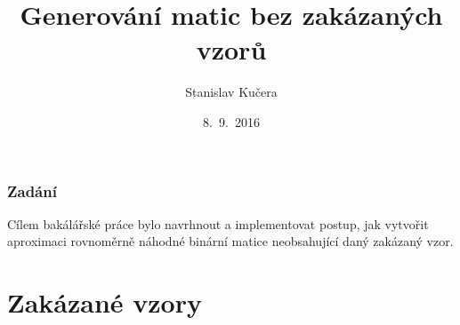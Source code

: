 \documentclass{beamer}
\title{Generování matic bez zakázaných vzorů}
\author{Stanislav Kučera}
\institute[IÚUK]{Informatický ústav Univerzity Karlovy}
\date{8.~9.~2016}
\begin{document}
\begin{frame}
\titlepage
\end{frame}

\begin{frame}
\frametitle{Zadání}
Cílem bakálářské práce bylo navrhnout a implementovat postup, jak vytvořit aproximaci rovnoměrně náhodné binární matice neobsahující daný zakázaný vzor.
\end{frame}

\section{Zakázané vzory}
\end{document}
